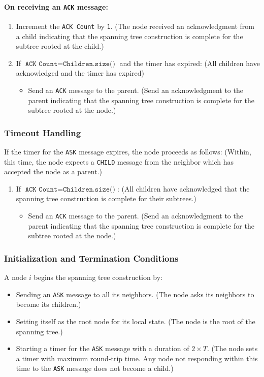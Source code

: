 \paragraph{On receiving an \texttt{ACK} message:}
\begin{enumerate}
    \item Increment the \texttt{ACK Count} by \texttt{1}. (The node received an acknowledgment from a child indicating that the spanning tree construction is complete for the subtree rooted at the child.)
    \item If \(\texttt{ACK Count} = \texttt{Children.size()}\) and the timer has expired: (All children have acknowledged and the timer has expired)
    \begin{itemize}
        \item Send an \texttt{ACK} message to the parent. (Send an acknowledgment to the parent indicating that the spanning tree construction is complete for the subtree rooted at the node.)
    \end{itemize}
\end{enumerate}

\subsubsection{Timeout Handling}
If the timer for the \texttt{ASK} message expires, the node proceeds as follows: (Within, this time, the node expects a \texttt{CHILD} message from the neighbor which has accepted the node as a parent.)
\begin{enumerate}
    \item If \(\texttt{ACK Count} = \texttt{Children.size()}\): (All children have acknowledged that the spanning tree construction is complete for their subtrees.)
    \begin{itemize}
        \item Send an \texttt{ACK} message to the parent. (Send an acknowledgment to the parent indicating that the spanning tree construction is complete for the subtree rooted at the node.)
    \end{itemize}
\end{enumerate}

\subsubsection{Initialization and Termination Conditions}
A node \(i\) begins the spanning tree construction by:
\begin{itemize}
    \item Sending an \texttt{ASK} message to all its neighbors. (The node asks its neighbors to become its children.)   
    \item Setting itself as the root node for its local state. (The node is the root of the spanning tree.)
    \item Starting a timer for the \texttt{ASK} message with a duration of \(2 \times T\). (The node sets a timer with maximum round-trip time. Any node not responding within this time to the \texttt{ASK} message does not become a child.)
\end{itemize}

